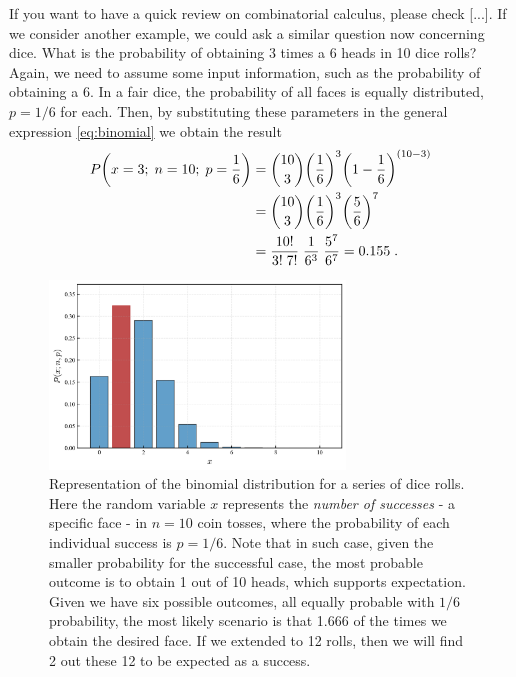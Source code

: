 \documentclass{book}
\begin{document}
If you want to have a quick review on combinatorial calculus, please check [...]. If we consider another example, we could ask a similar question now concerning dice. What is the probability of obtaining 3 times a 6 heads in 10 dice rolls? Again, we need to assume some input information, such as the probability of obtaining a 6. In a fair dice, the probability of all faces is equally distributed, $p = 1/6$ for each. Then, by substituting these parameters in the general expression \eqref{eq:binomial} we obtain the result
\begin{align}
    P\bigg(x=3; \; n = 10; \; p = \frac{1}{6}\bigg) & = \binom{10}{3} \bigg(\frac{1}{6}\bigg)^3 \bigg(1 - \frac{1}{6}\bigg)^{(10 - 3)}  \notag \\
	& = \binom{10}{3} \bigg(\frac{1}{6}\bigg)^3 \bigg(\frac{5}{6}\bigg)^7 \notag \\
	& = \frac{10!}{3! \; 7!} \; \frac{1}{6^3} \; \frac{5^7}{6^7} = 0.155 \; . \nonumber
\end{align}

\begin{figure}[ht]
    \centering
    \includegraphics[width=0.7\textwidth]{figures/chapter2/binomial_2.png}
    \caption{Representation of the binomial distribution for a series of dice rolls. Here the random variable $x$ represents the \textit{number of successes} - a specific face - in $n = 10$ coin tosses, where the probability of each individual success is $p = 1/6$. Note that in such case, given the smaller probability for the successful case, the most probable outcome is to obtain 1 out of 10 heads, which supports expectation. Given we have six possible outcomes, all equally probable with $1/6$ probability, the most likely scenario is that 1.666 of the times we obtain the desired face. If we extended to 12 rolls, then we will find 2 out these 12 to be expected as a success.}
    \label{fig:binomial2}
\end{figure}
\end{document}

